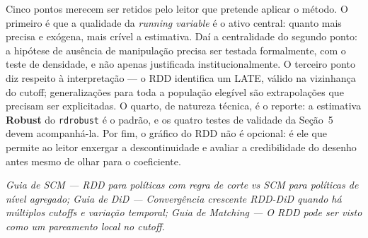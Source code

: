 \documentclass[12pt, a4paper, openany]{book}
\begin{document}
Cinco pontos merecem ser retidos pelo leitor que pretende aplicar o m\'etodo. O primeiro \'e que a qualidade da \textit{running variable} \'e o ativo central: quanto mais precisa e ex\'ogena, mais cr\'ivel a estimativa. Da\'i a centralidade do segundo ponto: a hip\'otese de aus\^encia de manipula\c{c}\~ao precisa ser testada formalmente, com o teste de densidade, e n\~ao apenas justificada institucionalmente. O terceiro ponto diz respeito \`a interpreta\c{c}\~ao --- o RDD identifica um LATE, v\'alido na vizinhan\c{c}a do cutoff; generaliza\c{c}\~oes para toda a popula\c{c}\~ao eleg\'ivel s\~ao extrapola\c{c}\~oes que precisam ser explicitadas. O quarto, de natureza t\'ecnica, \'e o reporte: a estimativa \textbf{Robust} do \texttt{rdrobust} \'e o padr\~ao, e os quatro testes de validade da Se\c{c}\~ao~5 devem acompanh\'a-la. Por fim, o gr\'afico do RDD n\~ao \'e opcional: \'e ele que permite ao leitor enxergar a descontinuidade e avaliar a credibilidade do desenho antes mesmo de olhar para o coeficiente.

\begin{conexaobox}
\textit{Guia de SCM --- RDD para pol\'iticas com regra de corte vs SCM para pol\'iticas de n\'ivel agregado; Guia de DiD --- Converg\^encia crescente RDD-DiD quando h\'a m\'ultiplos cutoffs e varia\c{c}\~ao temporal; Guia de Matching --- O RDD pode ser visto como um pareamento local no cutoff.}
\end{conexaobox}


\newpage

\end{document}
